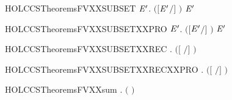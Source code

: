 \newcommand{\HOLCCSTheoremsFVXXrestr}{\UseVerbatim{HOLCCSTheoremsFVXXrestr}}
\begin{SaveVerbatim}{HOLCCSTheoremsFVXXSUBSET}
\HOLTokenTurnstile{} \HOLSymConst{\HOLTokenForall{}}  \ensuremath{\HOLBoundVar{E}\sp{\prime{}}}.  \ensuremath{(}\ensuremath{[}\ensuremath{\HOLBoundVar{E}\sp{\prime{}}}\ensuremath{/}\ensuremath{]} \ensuremath{)} \HOLConst{\HOLTokenSubset{}}   \HOLConst{\HOLTokenUnion{}}  \ensuremath{\HOLBoundVar{E}\sp{\prime{}}}
\end{SaveVerbatim}
\newcommand{\HOLCCSTheoremsFVXXSUBSET}{\UseVerbatim{HOLCCSTheoremsFVXXSUBSET}}
\begin{SaveVerbatim}{HOLCCSTheoremsFVXXSUBSETXXPRO}
\HOLTokenTurnstile{} \HOLSymConst{\HOLTokenForall{}}  \ensuremath{\HOLBoundVar{E}\sp{\prime{}}}.  \ensuremath{(}\ensuremath{[}\ensuremath{\HOLBoundVar{E}\sp{\prime{}}}\ensuremath{/}\ensuremath{]} \ensuremath{)} \HOLConst{\HOLTokenSubset{}}     \HOLConst{\HOLTokenUnion{}}  \ensuremath{\HOLBoundVar{E}\sp{\prime{}}}
\end{SaveVerbatim}
\newcommand{\HOLCCSTheoremsFVXXSUBSETXXPRO}{\UseVerbatim{HOLCCSTheoremsFVXXSUBSETXXPRO}}
\begin{SaveVerbatim}{HOLCCSTheoremsFVXXSUBSETXXREC}
\HOLTokenTurnstile{} \HOLSymConst{\HOLTokenForall{}} .  \ensuremath{(}\ensuremath{[}  \ensuremath{/}\ensuremath{]} \ensuremath{)} \HOLConst{\HOLTokenSubset{}}  
\end{SaveVerbatim}
\newcommand{\HOLCCSTheoremsFVXXSUBSETXXREC}{\UseVerbatim{HOLCCSTheoremsFVXXSUBSETXXREC}}
\begin{SaveVerbatim}{HOLCCSTheoremsFVXXSUBSETXXRECXXPRO}
\HOLTokenTurnstile{} \HOLSymConst{\HOLTokenForall{}} .  \ensuremath{(}\ensuremath{[}  \ensuremath{/}\ensuremath{]} \ensuremath{)} \HOLConst{\HOLTokenSubset{}}    
\end{SaveVerbatim}
\newcommand{\HOLCCSTheoremsFVXXSUBSETXXRECXXPRO}{\UseVerbatim{HOLCCSTheoremsFVXXSUBSETXXRECXXPRO}}
\begin{SaveVerbatim}{HOLCCSTheoremsFVXXsum}
\HOLTokenTurnstile{} \HOLSymConst{\HOLTokenForall{}} .  \ensuremath{(} \HOLSymConst{\ensuremath{+}} \ensuremath{)} \HOLSymConst{\ensuremath{=}}   \HOLConst{\HOLTokenUnion{}}  
\end{SaveVerbatim}
